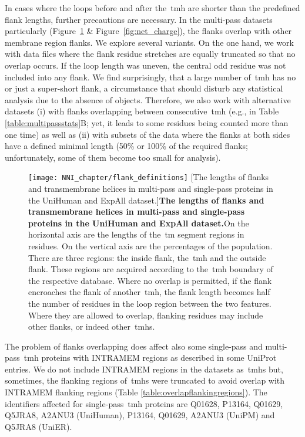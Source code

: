 In cases where the loops before and after the~\gls{tmh} are shorter than the predefined flank lengths, further precautions are necessary.
In the multi-pass datasets particularly (Figure~\ref{fig:flank_definitions} \& Figure~\ref{fig:net_charge}), the flanks overlap with other membrane region flanks.
We explore several variants.
On the one hand, we work with data files where the flank residue stretches are equally truncated so that no overlap occurs.
If the loop length was uneven, the central odd residue was not included into any flank.
We find surprisingly, that a large number of~\gls{tmh} has no or just a super-short flank, a circumstance that should disturb any statistical analysis due to the absence of objects.
Therefore, we also work with alternative datasets (i) with flanks overlapping between consecutive~\gls{tmh} (e.g., in Table \ref{table:multipassstats}B; yet, it leads to some residues being counted more than one time) as well as (ii) with subsets of the data where the flanks at both sides have a defined minimal length (50\% or 100\% of the required flanks; unfortunately, some of them become too small for analysis).

\begin{figure}[!ht]
\centering
\texttt{[image: NNI\_chapter/flank\_definitions]}
[The lengths of flanks and transmembrane helices in multi-pass and single-pass proteins in the UniHuman and ExpAll dataset.]{\textbf{The lengths of flanks and transmembrane helices in multi-pass and single-pass proteins in the UniHuman and ExpAll dataset.}On the horizontal axis are the lengths of the~\gls{tm} segment regions in residues.
On the vertical axis are the percentages of the population.
There are three regions: the inside flank, the~\gls{tmh} and the outside flank.
These regions are acquired according to the~\gls{tmh} boundary of the respective database.
Where no overlap is permitted, if the flank encroaches the flank of another~\gls{tmh}, the flank length becomes half the number of residues in the loop region between the two features.
Where they are allowed to overlap, flanking residues may include other flanks, or indeed other~\gls{tmh}s.}

\label{fig:flank_definitions}
\end{figure}

The problem of flanks overlapping does affect also some single-pass and multi-pass~\gls{tmh} proteins with INTRAMEM regions as described in some UniProt entries.
We do not include INTRAMEM regions in the datasets as~\gls{tmh}s but, sometimes, the flanking regions of~\gls{tmh}s were truncated to avoid overlap with INTRAMEM flanking regions (Table \ref{table:overlapflankingregions}).
 The identifiers affected for single-pass~\gls{tmh} proteins are Q01628, P13164, Q01629, Q5JRA8, A2ANU3 (UniHuman), P13164, Q01629, A2ANU3 (UniPM) and Q5JRA8 (UniER).


